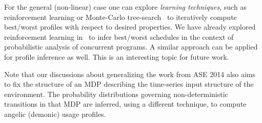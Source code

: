 For the general (non-linear) case one can explore {\em learning
  techniques}, such as reinforcement learning or Monte-Carlo
tree-search~\cite{sutton1998reinforcement} to iteratively compute
best/worst profiles with respect to desired properties. We have
already explored reinforcement learning in~\cite{luckow2014probabilistic} to
infer best/worst schedules in the context of probabilistic analysis of
concurrent programs. A similar approach can be applied for profile
inference as well. This is an interesting topic for future work.


Note that our discussions about generalizing the work from ASE 2014 
also aims to fix the structure of an MDP describing the time-series
input structure of the environment.  The probability distributions
governing non-deterministic transitions in that MDP are inferred,
using a different technique, to compute angelic (demonic) usage
profiles.


